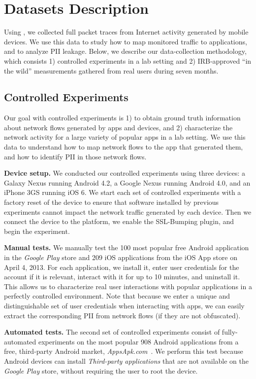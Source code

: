 \section{Datasets Description}
\label{sec:dataset}
Using \platname, we collected full packet traces from Internet activity generated by
mobile devices. We use this data to study how to map monitored traffic to applications, and to
analyze PII leakage. Below, we describe our data-collection methodology, which consists 
1) controlled experiments in a lab setting and 2) IRB-approved ``in the wild'' measurements 
gathered from real users during seven months.

\subsection{Controlled Experiments}
\label{sec:dataset-contr-exper}
Our goal with controlled experiments is 1) to obtain ground truth information 
about network flows generated by apps and devices, and 2) characterize the 
network activity for a large variety of popular apps in a lab setting. We use 
this data to understand how to map network flows to the app that generated 
them, and how to identify PII in those network flows. 

\noindent\textbf{Device setup.} We conducted our controlled experiments using three devices: a Galaxy
Nexus running Android 4.2, a Google Nexus running Android 4.0, and
an iPhone 3GS running iOS 6. We start each set of controlled experiments
 with a factory reset of the device to ensure that software installed by previous 
 experiments cannot impact the network traffic generated by each device. 
 Then we connect the device to the
\platname{} platform, we enable the SSL-Bumping plugin, and begin
the experiment. 

\noindent\textbf{Manual tests.} We manually test the
100 most popular free Android application in the \emph{Google Play} store and 209
iOS applications from the iOS App store on April 4, 2013. For each
application, we install it, enter user credentials for the account if
it is relevant, interact with it for up to 10 minutes, and uninstall
it. This allows us to characterize real user interactions with popular applications 
in a perfectly controlled environment. Note that 
because we enter a unique and distinguishable set of user credentials when 
interacting with apps, we can easily extract the corresponding PII from 
network flows (if they are not obfuscated).

\noindent\textbf{Automated tests.} The second set of controlled experiments consist of fully-automated
experiments on the most popular 908 Android applications from a free,
third-party Android market, \emph{AppsApk.com}~\cite{appsapk}.
We perform this test because Android devices can install
\emph{Third-party applications} that are not available on the
\emph{Google Play} store, without requiring the user to root the device. 

